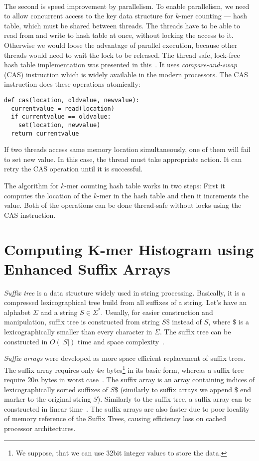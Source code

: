 \paragraph{} The second is speed improvement by parallelism. To enable parallelism, we need to allow concurrent access to the key data structure for $k$-mer counting --- hash table, which must be shared between threads. The threads have to be able to read from and write to hash table at once, without locking the access to it. Otherwise we would loose the advantage of parallel execution, because other threads would need to wait the lock to be released. The thread safe, lock-free hash table implementation was presented in this~\cite{jellyfish}. It uses \emph{compare-and-swap} (CAS) instruction which is widely available in the modern processors. The CAS instruction does these operations atomically:
\begin{lstlisting}
def cas(location, oldvalue, newvalue):
  currentvalue = read(location)
  if currentvalue == oldvalue:
    set(location, newvalue)
  return currentvalue
\end{lstlisting}
If two threads access same memory location simultaneously, one of them will fail to set new value. In this case, the thread must take appropriate action.
It can retry the CAS operation until it is successful.

The algorithm for $k$-mer counting hash table works in two steps:
First it computes the location of the $k$-mer in the hash table and then it increments the value. Both of the operations can be done thread-safe without locks using the CAS instruction.

\section{Computing K-mer Histogram using Enhanced Suffix Arrays}

\emph{Suffix tree}\cite{suffixtree} is a data structure widely used in string processing. Basically, it is a compressed lexicographical tree build from all suffixes of a string. Let's have an alphabet $\Sigma$ and a string $S \in \Sigma^*$. Usually, for easier construction and manipulation, suffix tree is constructed from string $S\$$ instead of $S$, where $\$$ is a lexicographically smaller than every character in $\Sigma$. The suffix tree can be constructed in $O(|S|)$ time and space complexity~\cite{suffixtree}.

\emph{Suffix arrays}\cite{suffixarray} were developed as more space efficient replacement of suffix trees. The suffix array requires only $4n$ bytes\footnote{We suppose, that we can use 32bit integer values to store the data.} in its basic form, whereas a suffix tree require $20n$ bytes in worst case~\cite{kurtz1999reducing}. The suffix array is an array containing indices of lexicographically sorted suffixes of $S\$$ (similarly to suffix arrays we append $\$$ end marker to the original string $S$). Similarly to the suffix tree, a suffix array can be constructed in linear time~\cite{karkkainen2003simple, kim2003linear, ko2003space}. The suffix arrays are also faster due to poor locality of memory reference of the Suffix Trees, causing efficiency loss on cached processor architectures.

